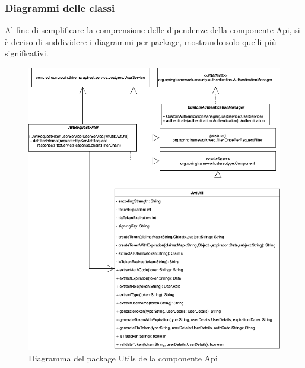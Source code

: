 	\subsubsection{Diagrammi delle classi}
		Al fine di semplificare la comprensione delle dipendenze della componente Api, si è deciso di suddividere i diagrammi per package, mostrando solo quelli più significativi.

		\begin{figure}[H]
			\centering
			\includegraphics[scale=0.500]{res/images/API/UtilsPackage.png}
			\caption{Diagramma del package Utils della componente Api}
		\end{figure}
